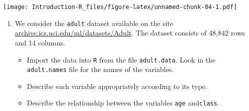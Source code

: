 \documentclass[]{book}
\providecommand{\tightlist}{%
  \setlength{\itemsep}{0pt}\setlength{\parskip}{0pt}}
\begin{document}
\texttt{[image: Introduction-R\_files/figure-latex/unnamed-chunk-84-1.pdf]}

\begin{enumerate}
\def\labelenumi{\arabic{enumi}.}
\setcounter{enumi}{1}
\tightlist
\item
  We consider the \texttt{adult} dataset available on the site \href{https://archive.ics.uci.edu/ml/datasets/Adult}{archive.ics.uci.edu/ml/datasets/Adult}. The dataset consists of 48,842 rows and 14 columns.

  \begin{itemize}
  \tightlist
  \item
    Import the data into \texttt{R} from the file \texttt{adult.data}. Look in the \texttt{adult.names} file for the names of the variables.
  \item
    Describe each variable appropriately according to its type.
  \item
    Describe the relationship between the variables \texttt{age} and\texttt{class}.
  \end{itemize}
\end{enumerate}


\end{document}
